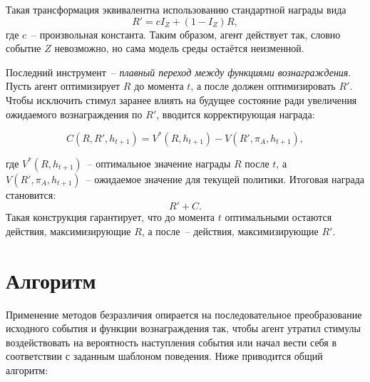 Такая трансформация эквивалентна использованию стандартной награды вида
\begin{equation}
    R' = c I_Z + (1 - I_Z) R,
\end{equation}
где $c$~-- произвольная константа. Таким образом, агент действует так, словно 
событие $Z$ невозможно, но сама модель среды остаётся неизменной.

Последний инструмент~-- \emph{плавный переход между функциями вознаграждения}. 
Пусть агент оптимизирует $R$ до момента $t$, а после должен оптимизировать $R'$. 
Чтобы исключить стимул заранее влиять на будущее состояние ради увеличения 
ожидаемого вознаграждения по $R'$, вводится корректирующая награда:

\begin{equation}
    C(R, R', h_{t+1}) = V^{*}(R, h_{t+1}) - V(R', \pi_A, h_{t+1}), 
\end{equation}

где $V^{*}(R, h_{t+1})$~-- оптимальное значение награды $R$ после $t$, 
а $V(R', \pi_A, h_{t+1})$~-- ожидаемое значение для текущей политики. 
Итоговая награда становится:
\begin{equation}
    R' + C.
\end{equation}
Такая конструкция гарантирует, что до момента $t$ оптимальными остаются действия,
максимизирующие $R$, а после~-- действия, максимизирующие $R'$.


\section{Алгоритм}

Применение методов безразличия опирается на последовательное преобразование 
исходного события и функции вознаграждения так, чтобы агент утратил стимулы 
воздействовать на вероятность наступления события или начал вести себя в 
соответствии с заданным шаблоном поведения. Ниже приводится общий алгоритм:


